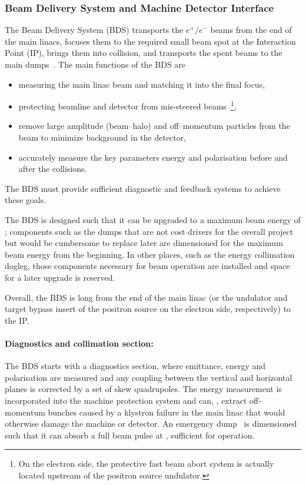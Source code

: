\subsubsection{Beam Delivery System and Machine Detector Interface}

The Beam Delivery System (BDS) transports the $e^+/e^-$ beams from the end of the main linacs, focuses them to the required small beam spot at the Interaction Point (IP), brings them into collision, and transports the spent beams to the main dumps~\cite[Chap. 8]{Adolphsen:2013kya}.
The main functions of the BDS are
\begin{itemize}
\item measuring the main linac beam and matching it into the final focus,
\item protecting beamline and detector from mis-steered beams~\footnote{On the electron side, the protective fast beam abort system is actually located upstream of the positron source undulator.},
\item remove large amplitude (beam--halo) and off--momentum particles from the beam to minimize background in the detector,
\item accurately measure the key parameters energy and polarisation before and after the collisions.
\end{itemize}
The BDS must provide sufficient diagnostic and feedback systems to achieve these goals.

The BDS is designed such that it can be upgraded to a maximum beam energy of ; components such as the dumps that are not cost drivers for the overall project but would be cumbersome to replace later are dimensioned for the maximum beam energy from the beginning.
In other places, such as the energy collimation dogleg, those components necessary for  beam operation are installed and space for a later upgrade is reserved.

Overall, the BDS is  long from the end of the main linac (or the undulator and target bypass insert of the positron source on the electron side, respectively) to the IP.

\paragraph{Diagnostics and collimation section:}
The BDS starts with a diagnostics section, where emittance, energy and polarisation are measured and any coupling between the vertical and horizontal planes is corrected by a set of skew quadrupoles.
The energy measurement is incorporated into the machine protection system and can, \eg,  extract off-momentum bunches caused by a klystron failure in the main linac that would otherwise damage the machine or detector.
An emergency dump~\cite{bib:cr-0013} is dimensioned such that it can absorb a full beam pulse at , sufficient for  operation.

